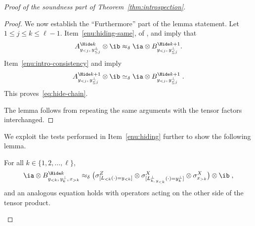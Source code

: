\begin{proof}[Proof of the soundness part of Theorem~\ref{thm:introspection}]
\begin{proof}
    We now establish the ``Furthermore'' part of the lemma statement.
    Let $1 \leq j \leq k \leq \ell-1$.
    Item~\ref{enu:hiding-same},  of
    , and  imply that
    \begin{equation}
      \ahk[y_{<j},\, y_{\leq j}^\perp] \otimes \ib \approx_\delta
      \ia \otimes \bhp[y_{<j},\, y_{\leq j}^\perp].
    \end{equation}
    Item~\ref{enu:intro-consistency} and  imply
    \begin{equation}
      \ahp[y_{<j},\, y_{\leq j}^\perp] \otimes \ib \simeq_\delta
      \ia \otimes \bhp[y_{<j},\, y_{\leq j}^\perp]\;.
    \end{equation}
    This proves~\eqref{eq:hide-chain}.

    The lemma follows from repeating the same arguments with the tensor factors
    interchanged.
	\end{proof}
	
	We exploit the tests performed in Item~\ref{enu:hiding} further to show the
  following lemma.

  \begin{lemma}
    \label{lem:hide-rigidity}
    For all $k \in \{1, 2, \ldots, \ell\}$,
    \begin{equation*}
      \ia \otimes \bhk[y_{<k},\, y^\perp_k,\, x_{>k}] \approx_\delta
      \bigl( \zLlk \otimes \xLperpk \otimes \x[x_{>k}] \bigr) \otimes \ib\;,
    \end{equation*}
    and an analogous equation holds with operators acting on the other side of
    the tensor product.
  \end{lemma}


\end{proof}
